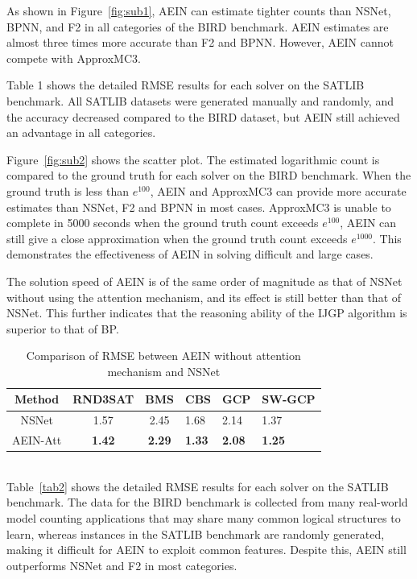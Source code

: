 As shown in Figure~\ref{fig:sub1}, AEIN can estimate tighter counts than NSNet, BPNN, and F2 in all categories 
of the BIRD benchmark. AEIN estimates are almost three times more accurate than F2 and BPNN. However, AEIN cannot 
compete with ApproxMC3.

Table 1 shows the detailed RMSE results for each solver on the SATLIB benchmark. All SATLIB datasets were 
generated manually and randomly, and the accuracy decreased compared to the BIRD dataset, but AEIN still 
achieved an advantage in all categories.

Figure~\ref{fig:sub2} shows the scatter plot. The estimated logarithmic count is compared to the ground truth 
for each solver on the BIRD benchmark. When the ground truth is less than \(e^{100}\), AEIN and ApproxMC3 can 
provide more accurate estimates than NSNet, F2 and BPNN in most cases. ApproxMC3 is unable to complete in 5000 
seconds when the ground truth count exceeds \(e^{100}\), AEIN can still give a close approximation when the ground 
truth count exceeds \(e^{1000}\). This demonstrates the effectiveness of AEIN in solving difficult and large cases.

The solution speed of AEIN is of the same order of magnitude as that of NSNet without using the attention mechanism, 
and its effect is still better than that of NSNet. This further indicates that the reasoning ability of the IJGP 
algorithm is superior to that of BP.

\begin{table}[htbp] 
  \centering  
  \caption{Comparison of RMSE between AEIN without attention mechanism and NSNet}  
  \begin{tabular}{ccclll}  
    \toprule
    Method& RND3SAT& BMS & CBS& GCP&SW-GCP\\  
    \midrule
    NSNet& 1.57& 2.45& 1.68& 2.14&1.37\\  
    AEIN-Att& \textbf{1.42}& \textbf{2.29}& \textbf{1.33}& \textbf{2.08}&\textbf{1.25}\\  
    \bottomrule
  \end{tabular}
  \label{tab1}  
\end{table}\\

Table~\ref{tab2} shows the detailed RMSE results for each solver on the SATLIB benchmark. The data for the BIRD benchmark 
is collected from many real-world model counting applications that may share many common logical structures to learn, whereas 
instances in the SATLIB benchmark are randomly generated, making it difficult for AEIN to exploit common features. Despite this, 
AEIN still outperforms NSNet and F2 in most categories.

